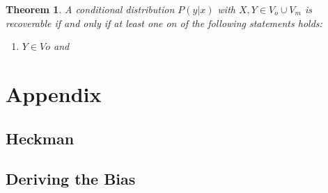 \documentclass[12pt,twoside]{reedthesis}
\newtheorem{theorem}{Theorem}
\theoremstyle{definition}
\begin{document}
 
\begin{theorem}
A conditional distribution $P(y | x)$ with $X, Y \in V_o \cup V_m$ is recoverable if and only if at least one on of the following statements holds:

\begin{enumerate}
\item $Y \in Vo$ and 
\end{enumerate}
\end{theorem}





  \backmatter %

    \nocite{*}


%  
 
\nocite{*}%
%  
\appendix
\chapter{Appendix}

\section{Heckman}

\section{Deriving the Bias}
\end{document}
